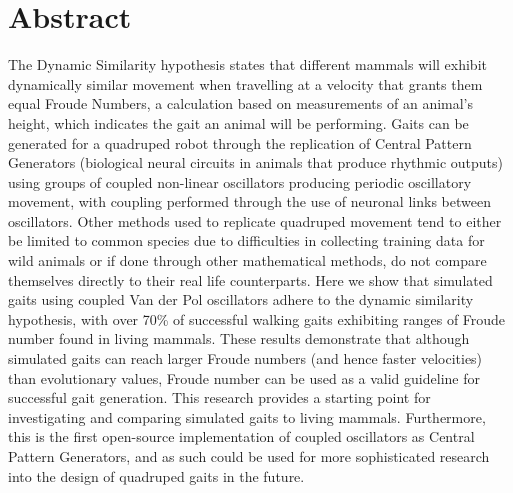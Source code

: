 \chapter*{\Large \center Abstract}


The Dynamic Similarity hypothesis states that different mammals will exhibit dynamically similar movement when travelling at a velocity that grants them equal Froude Numbers, a calculation based on measurements of an animal's height, which indicates the gait an animal will be performing. Gaits can be generated for a quadruped robot through the replication of Central Pattern Generators (biological neural circuits in animals that produce rhythmic outputs) using groups of coupled non-linear oscillators producing periodic oscillatory movement, with coupling performed through the use of neuronal links between oscillators. Other methods used to replicate quadruped movement tend to either be limited to common species due to difficulties in collecting training data for wild animals or if done through other mathematical methods, do not compare themselves directly to their real life counterparts. Here we show that simulated gaits using coupled Van der Pol oscillators adhere to the dynamic similarity hypothesis, with over 70\%  of successful walking gaits exhibiting ranges of Froude number found in living mammals. These results demonstrate that although simulated gaits can reach larger Froude numbers (and hence faster velocities) than evolutionary values, Froude number can be used as a valid guideline for successful gait generation. This research provides a starting point for investigating and comparing simulated gaits to living mammals. Furthermore, this is the first open-source implementation of coupled oscillators as Central Pattern Generators, and as such could be used for more sophisticated research into the design of quadruped gaits in the future. 


